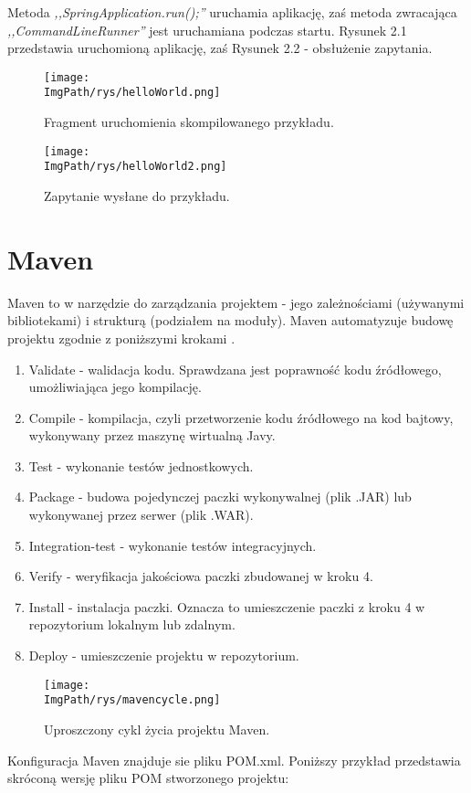 \documentclass[a4paper,12pt,twoside,openany]{report}
\newcommand{\ImgPath}{.}
\begin{document}
Metoda \textit{,,SpringApplication.run();''} uruchamia aplikację, zaś metoda zwracająca \textit{,,CommandLineRunner''} jest uruchamiana podczas startu. Rysunek 2.1 przedstawia uruchomioną aplikację, zaś Rysunek 2.2 - obsłużenie zapytania.
		\begin{figure}[!htbp]
			\begin{center}
				\centering
				\texttt{[image: \\ImgPath/rys/helloWorld.png]}
			\end{center}
			\caption{Fragment uruchomienia skompilowanego przykładu.}
			\label{UMLTS}
		\end{figure}
				\begin{figure}[!htbp]
					\begin{center}
						\centering
						\texttt{[image: \\ImgPath/rys/helloWorld2.png]}
					\end{center}
					\caption{Zapytanie wysłane do przykładu.}
					\label{UMLTS}
				\end{figure}
				

\section{Maven}
Maven to w narzędzie do zarządzania projektem - jego zależnościami (używanymi bibliotekami) i strukturą (podziałem na moduły). Maven automatyzuje budowę projektu zgodnie z poniższymi krokami \cite{Maven}.
\begin{enumerate}
	\item Validate - walidacja kodu. Sprawdzana jest poprawność kodu źródłowego, umożliwiająca jego kompilację.
	\item Compile - kompilacja, czyli przetworzenie kodu źródłowego na kod bajtowy, wykonywany przez maszynę wirtualną Javy.
	\item Test - wykonanie testów jednostkowych.
	\item Package - budowa pojedynczej paczki wykonywalnej (plik .JAR) lub wykonywanej przez serwer (plik .WAR).
	\item Integration-test - wykonanie testów integracyjnych.
	\item Verify - weryfikacja jakościowa paczki zbudowanej w kroku 4.
	\item Install - instalacja paczki. Oznacza to umieszczenie paczki z kroku 4 w repozytorium lokalnym lub zdalnym.
	\item Deploy - umieszczenie projektu w repozytorium.
\end{enumerate}
				\begin{figure}[!htbp]
					\begin{center}
						\centering
						\texttt{[image: \\ImgPath/rys/mavencycle.png]}
					\end{center}
					\caption{Uproszczony cykl życia projektu Maven.}
					\label{UMLTS}
				\end{figure}
Konfiguracja Maven znajduje sie pliku POM.xml. Poniższy przykład przedstawia skróconą wersję pliku POM stworzonego projektu:
\end{document}
